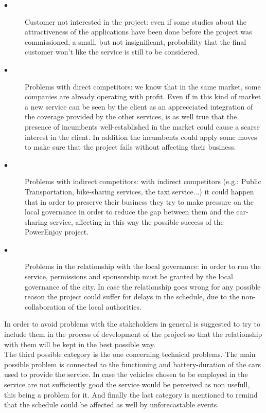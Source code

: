 \documentclass[a4paper,10pt]{article}
\begin{document}
 \begin{description}
    \item[$\bullet$] Customer not interested in the project: even if some studies about the attractiveness of the applications
    have been done before the project was commissioned, a small, but not insignificant, probability that the final customer won't like 
    the service is still to be considered.
    \item[$\bullet$] Problems with direct competitors: we know that in the same market, some companies are already operating with profit. Even 
    if in this kind of market a new service can be seen by the client as an apprecciated integration of the coverage provided by the other
    services, is as well true that the presence of incumbents well-established in the market could cause a scarse interest in the client. 
    In addition the incumbents could apply some moves to make sure that the project fails without affecting their business.
    \item[$\bullet$] Problems with indirect competitors: with indirect competitors (e.g.: Public Transportation,
    bike-sharing services, the taxi service...) it could happen that in order to preserve their business they try to make pressure
    on the local governance in order to reduce the gap between them and the car-sharing service, affecting in this way the possible success
    of the PowerEnjoy project.
    \item[$\bullet$] Problems in the relationship with the local governance: in order to run the service, permissions and sponsorship 
    must be granted by the local governance of the city. In case the relationship goes wrong for any possible reason the project could
    suffer for delays in the schedule, due to the non-collaboration of the local authorities.
  \end{description}
  In order to avoid problems with the stakeholders in general is suggested to try to include them in the process of development of the project
  so that the relationship with them will be kept in the best possible way.\\
  The third possible category is the one concerning technical problems. The main possible problem is connected to the functioning
  and battery-duration of the cars used to provide the service. In case the vehicles chosen to be employed in the service are not sufficiently
  good the service would be perceived as non usefull, this being a problem for it.
  And finally the last category is mentioned to remind that the schedule could be affected as well by unforecastable events. 
\end{document}
